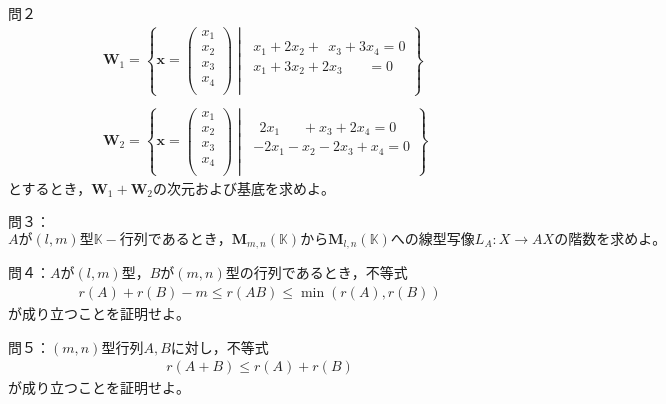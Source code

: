 \documentclass[dvipdfmx,uplatex,11pt]{jsarticle}
\begin{document}
%
%
%
\newpage
%
%
%
問２
\noindent
\begin{eqnarray*}
& \bm{W}_1=
\left\{
\bm{x}=
\begin{pmatrix}
x_1 \\
x_2 \\
x_3 \\
x_4 \\
\end{pmatrix}
\middle|~
\begin{matrix}
x_1+2x_2+~~x_3+3x_4=0 \\
x_1+3x_2+2x_3~~~~~~~~=0 \\
\end{matrix}
\right\} \\ \\
& \bm{W}_2=
\left\{
\bm{x}=
\begin{pmatrix}
x_1 \\
x_2 \\
x_3 \\
x_4 \\
\end{pmatrix}
\middle|~
\begin{matrix}
~~2x_1~~~~~~~+x_3+2x_4=0 \\
-2x_1-x_2-2x_3+x_4=0 \\
\end{matrix}
\right\}
\end{eqnarray*}
とするとき，$\bm{W}_1+\bm{W}_2 の次元および基底を求めよ。$





%
%
%
\newpage
%
%
%
\noindent
問３：$Aが(l,m)型\mathbb{K}-行列であるとき，\bm{M}_{m,n}(\mathbb{K})から\bm{M}_{l,n}(\mathbb{K})への線型写像L_A:X \rightarrow AXの階数を求めよ。$











%
%
%
\newpage
%
%
%
\noindent
問４：$Aが(l,m)型，Bが(m,n)型の行列であるとき，不等式$
\begin{eqnarray*}
r(A)+r(B)-m \leq r(AB) \leq \min (r(A),r(B))
\end{eqnarray*}
が成り立つことを証明せよ。












%
%
%
\newpage
%
%
%
\noindent
問５：$(m,n)型行列A,Bに対し，不等式$
\begin{eqnarray*}
r(A+B) \leq r(A)+r(B)
\end{eqnarray*}
が成り立つことを証明せよ。
\end{document}
